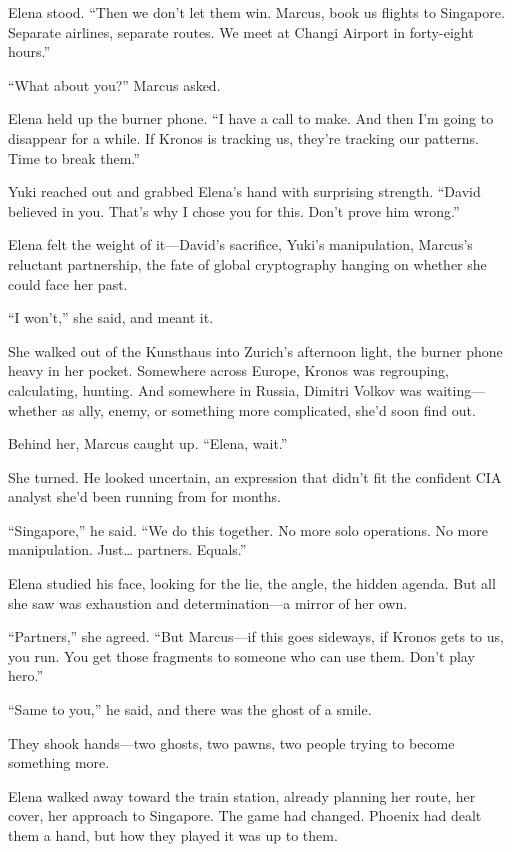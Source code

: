 Elena stood. ``Then we don't let them win. Marcus, book us flights to Singapore. Separate airlines, separate routes. We meet at Changi Airport in forty-eight hours.''

``What about you?'' Marcus asked.

Elena held up the burner phone. ``I have a call to make. And then I'm going to disappear for a while. If Kronos is tracking us, they're tracking our patterns. Time to break them.''

Yuki reached out and grabbed Elena's hand with surprising strength. ``David believed in you. That's why I chose you for this. Don't prove him wrong.''

Elena felt the weight of it---David's sacrifice, Yuki's manipulation, Marcus's reluctant partnership, the fate of global cryptography hanging on whether she could face her past.

``I won't,'' she said, and meant it.

She walked out of the Kunsthaus into Zurich's afternoon light, the burner phone heavy in her pocket. Somewhere across Europe, Kronos was regrouping, calculating, hunting. And somewhere in Russia, Dimitri Volkov was waiting---whether as ally, enemy, or something more complicated, she'd soon find out.

Behind her, Marcus caught up. ``Elena, wait.''

She turned. He looked uncertain, an expression that didn't fit the confident CIA analyst she'd been running from for months.

``Singapore,'' he said. ``We do this together. No more solo operations. No more manipulation. Just\ldots{} partners. Equals.''

Elena studied his face, looking for the lie, the angle, the hidden agenda. But all she saw was exhaustion and determination---a mirror of her own.

``Partners,'' she agreed. ``But Marcus---if this goes sideways, if Kronos gets to us, you run. You get those fragments to someone who can use them. Don't play hero.''

``Same to you,'' he said, and there was the ghost of a smile.

They shook hands---two ghosts, two pawns, two people trying to become something more.

Elena walked away toward the train station, already planning her route, her cover, her approach to Singapore. The game had changed. Phoenix had dealt them a hand, but how they played it was up to them.

